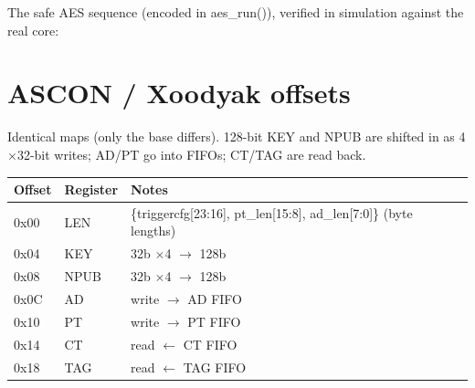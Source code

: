 \documentclass[11pt,a4paper]{report}
\newcommand{\code}[1]{{\ttfamily\small #1}}
\begin{document}
The safe AES sequence (encoded in \code{aes\_run()}), verified in simulation
against the real core:
\begin{center}
\end{center}

\section{ASCON / Xoodyak offsets}
Identical maps (only the base differs). 128-bit KEY and NPUB are shifted in as
4$\times$32-bit writes; AD/PT go into FIFOs; CT/TAG are read back.
\begin{center}
\begin{tabular}{llp{7cm}}
\toprule
Offset & Register & Notes \\ \midrule
\code{0x00} & LEN & \code{\{triggercfg[23:16], pt\_len[15:8], ad\_len[7:0]\}} (byte lengths) \\
\code{0x04} & KEY & 32b $\times$4 $\rightarrow$ 128b \\
\code{0x08} & NPUB & 32b $\times$4 $\rightarrow$ 128b \\
\code{0x0C} & AD & write $\rightarrow$ AD FIFO \\
\code{0x10} & PT & write $\rightarrow$ PT FIFO \\
\code{0x14} & CT & read $\leftarrow$ CT FIFO \\
\code{0x18} & TAG & read $\leftarrow$ TAG FIFO \\
\bottomrule
\end{tabular}\end{center}
\end{document}
